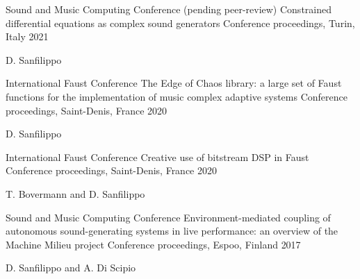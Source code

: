 

\begin{cventries}

  \cventry
    {Sound and Music Computing Conference} %
    {(pending peer-review) Constrained differential equations as complex sound generators} %
    {Conference proceedings, Turin, Italy} %
    {2021} %
    {
      \begin{cvitems} %
        \item {D. Sanfilippo}
      \end{cvitems}
    }

  \cventry
    {International Faust Conference} %
    {The Edge of Chaos library: a large set of Faust functions for the implementation of music complex adaptive systems} %
    {Conference proceedings, Saint-Denis, France} %
    {2020} %
    {
      \begin{cvitems} %
        \item {D. Sanfilippo}
      \end{cvitems}
    }

  \cventry
    {International Faust Conference} %
    {Creative use of bitstream DSP in Faust} %
    {Conference proceedings, Saint-Denis, France} %
    {2020} %
    {
      \begin{cvitems} %
        \item {T. Bovermann and D. Sanfilippo}
      \end{cvitems}
    }

  \cventry
    {Sound and Music Computing Conference} %
    {Environment-mediated coupling of autonomous sound-generating systems in live performance: an overview of the Machine Milieu project} %
    {Conference proceedings, Espoo, Finland} %
    {2017} %
    {
      \begin{cvitems} %
        \item {D. Sanfilippo and A. Di Scipio}
      \end{cvitems}
    }


\end{cventries}
